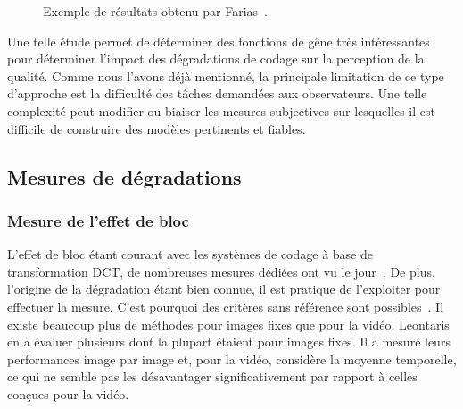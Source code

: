 \begin{figure}[htbp]
	\centering
	\hfill
	\caption{Exemple de résultats obtenu par Farias~\cite{farias-phd}.}
	\label{fig:farias}
\end{figure}

Une telle étude permet de déterminer des fonctions de gêne très intéressantes pour déterminer l'impact des dégradations de codage sur la perception de la qualité. Comme nous l'avons déjà mentionné, la principale limitation de ce type d'approche est la difficulté des tâches demandées aux observateurs. Une telle complexité peut modifier ou biaiser les mesures subjectives sur lesquelles il est difficile de construire des modèles pertinents et fiables.


\subsection{Mesures de dégradations}
\subsubsection{Mesure de l'effet de bloc}
L'effet de bloc étant courant avec les systèmes de codage à base de transformation DCT, de nombreuses mesures dédiées ont vu le jour~\cite{karunasekera-spie1993,coudoux-jvcir1997}. De plus, l'origine de la dégradation étant bien connue, il est pratique de l'exploiter pour effectuer la mesure. C'est pourquoi des critères sans référence sont possibles~\cite{perra-icip2005,liu-measureReducBlock,meesters-sp2002, babu-pv2004}. Il existe beaucoup plus de méthodes pour images fixes que pour la vidéo. Leontaris~\cite{leontaris-icassp2005} en a évaluer plusieurs dont la plupart étaient pour images fixes. Il a mesuré leurs performances image par image et, pour la vidéo, considère la moyenne temporelle, ce qui ne semble pas les désavantager significativement par rapport à celles conçues pour la vidéo.

